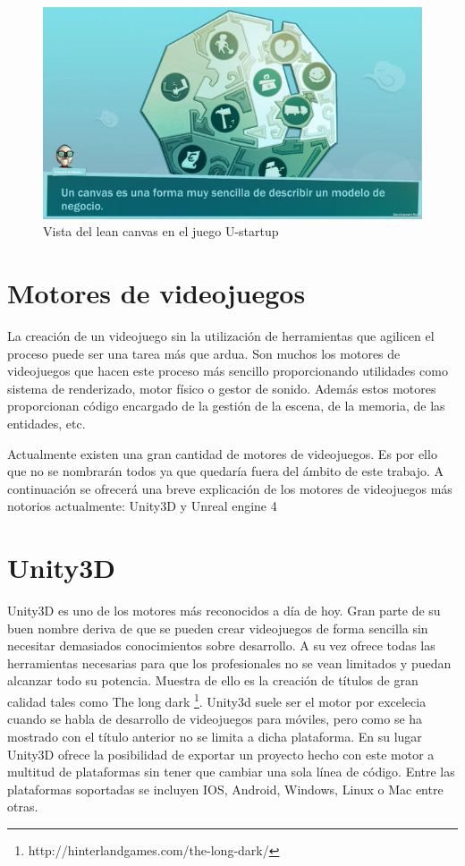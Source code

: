 \begin{description}
\begin{figure}
\begin{center}
\includegraphics[scale=0.6]{imagenes/ustartup01.jpg}
\caption{Vista del lean canvas en el juego U-startup}
\label{ustartup01}
\end{center}
\end{figure}

\end{description}


\section{Motores de videojuegos}

La creación de un videojuego sin la utilización de herramientas que agilicen el proceso puede ser una tarea más que ardua. Son muchos los motores de videojuegos que hacen este proceso más sencillo proporcionando utilidades como sistema de renderizado, motor físico o gestor de sonido. Además estos motores proporcionan código encargado de la gestión de la escena, de la memoria, de las entidades, etc.

Actualmente existen una gran cantidad de motores de videojuegos. Es por ello que no se nombrarán todos ya que quedaría fuera del ámbito de este trabajo. A continuación se ofrecerá una breve explicación de los motores de videojuegos más notorios actualmente: Unity3D y Unreal engine 4

\section{Unity3D}

Unity3D es uno de los motores más reconocidos a día de hoy. Gran parte de su buen nombre deriva de que se pueden crear videojuegos de forma sencilla sin necesitar demasiados conocimientos sobre desarrollo. A su vez ofrece todas las herramientas necesarias para que los profesionales no se vean limitados y puedan alcanzar todo su potencia. Muestra de ello es la creación de títulos de gran calidad tales como The long dark \footnote{http://hinterlandgames.com/the-long-dark/}. Unity3d suele ser el motor por excelecia cuando se habla de desarrollo de videojuegos para móviles, pero como se ha mostrado con el título anterior no se limita a dicha plataforma. En su lugar Unity3D ofrece la posibilidad de exportar un proyecto hecho con este motor a multitud de plataformas sin tener que cambiar una sola línea de código. Entre las plataformas soportadas se incluyen IOS, Android, Windows, Linux o Mac entre otras.

